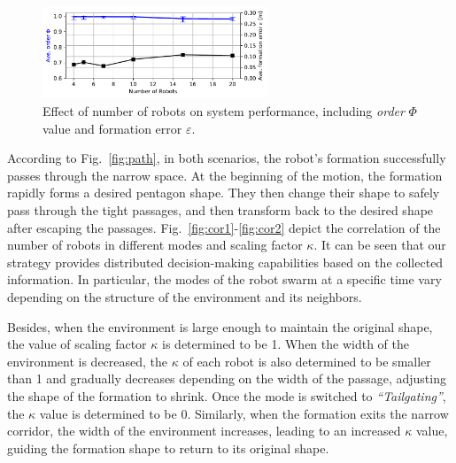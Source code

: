 \begin{figure}[h!]
    \centering
    \includegraphics[width=0.6\textwidth]{paper3/images/scalability.pdf}
    \caption{Effect of number of robots on system performance, including \textit{order} $\Phi$ value and formation error $\varepsilon$.}
    \label{fig:scalability}
\end{figure}

According to Fig.~\ref{fig:path}, in both scenarios, the robot's formation successfully passes through the narrow space. At the beginning of the motion, the formation rapidly forms a desired pentagon shape. They then change their shape to safely pass through the tight passages, and then transform back to the desired shape after escaping the passages. Fig.~\ref{fig:cor1}-\ref{fig:cor2} depict the correlation of the number of robots in different modes and scaling factor $\kappa$. It can be seen that our strategy provides distributed decision-making capabilities based on the collected information. In particular, the modes of the robot swarm at a specific time vary depending on the structure of the environment and its neighbors. 

Besides, when the environment is large enough to maintain the original shape, the value of scaling factor $\kappa$ is determined to be 1. When the width of the environment is decreased, the $\kappa$ of each robot is also determined to be smaller than 1 and gradually decreases depending on the width of the passage, adjusting the shape of the formation to shrink. Once the mode is switched to \textit{``Tailgating''}, the $\kappa$ value is determined to be 0. Similarly, when the formation exits the narrow corridor, the width of the environment increases, leading to an increased $\kappa$ value, guiding the formation shape to return to its original shape.

